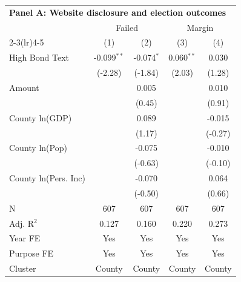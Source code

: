 \begingroup
\centering
\begin{tabular*}{\textwidth}{@{\extracolsep{\fill}}lcccc}
\multicolumn{5}{l}{\textbf{Panel A: Website disclosure and election outcomes}}\\

\addlinespace
   \toprule
    & \multicolumn{2}{c}{Failed} & \multicolumn{2}{c}{Margin}\\
   \cmidrule(lr){2-3}\cmidrule(lr){4-5}
                        & (1)           & (2)          & (3)          & (4)\\  
   \midrule 
   High Bond Text       & -0.099$^{**}$ & -0.074$^{*}$ & 0.060$^{**}$ & 0.030\\   
                        & (-2.28)      & (-1.84)     & (2.03)      & (1.28)\\   
   Amount               &               & 0.005        &              & 0.010\\   
                        &               & (0.45)      &              & (0.91)\\   
   County ln(GDP)       &               & 0.089        &              & -0.015\\   
                        &               & (1.17)      &              & (-0.27)\\   
   County ln(Pop)       &               & -0.075       &              & -0.010\\   
                        &               & (-0.63)     &              & (-0.10)\\   
   County ln(Pers. Inc) &               & -0.070       &              & 0.064\\   
                        &               & (-0.50)     &              & (0.66)\\   
   \hline
   N         & 607           & 607          & 607          & 607\\  
   Adj. R$^2$       & 0.127         & 0.160        & 0.220        & 0.273\\  
   Year FE              & Yes           & Yes          & Yes          & Yes\\  
   Purpose FE           & Yes           & Yes          & Yes          & Yes\\  
   Cluster              & County & County & County & County\\  
   \bottomrule
\end{tabular*}
\par\endgroup
